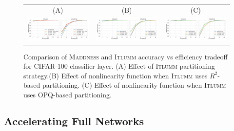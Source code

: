 \documentclass{article}
\begin{document}
\begin{figure}
    \centering
    \begin{tabular}{ccc}
    (A) & (B) & (C) \\
    \includegraphics[scale=0.47,clip=true,trim=4.2in 0 0in 0.3in]{figures/cifar-partitioning-heuristic.pdf} & \includegraphics[scale=0.47,clip=true,trim=4.2in 0 0in 0.3in]{figures/cifar-objective-wR2.pdf} &
    \includegraphics[scale=0.47,clip=true,trim=4.2in 0 0in 0.3in]{figures/cifar-objective-wOPQ.pdf}
    \end{tabular}
    \caption{Comparison of \textsc{Maddness} and \textsc{Itlumm} accuracy vs efficiency tradeoff for CIFAR-100 classifier layer. (A) Effect of \textsc{Itlumm} partitioning strategy.(B) Effect of nonlinearity function when \textsc{Itlumm} uses $R^2$-based partitioning.
    (C) Effect of nonlinearity function when \textsc{Itlumm} uses OPQ-based partitioning.}
    \label{fig:cifar100}
\end{figure}

\subsection{Accelerating Full Networks}
\end{document}

